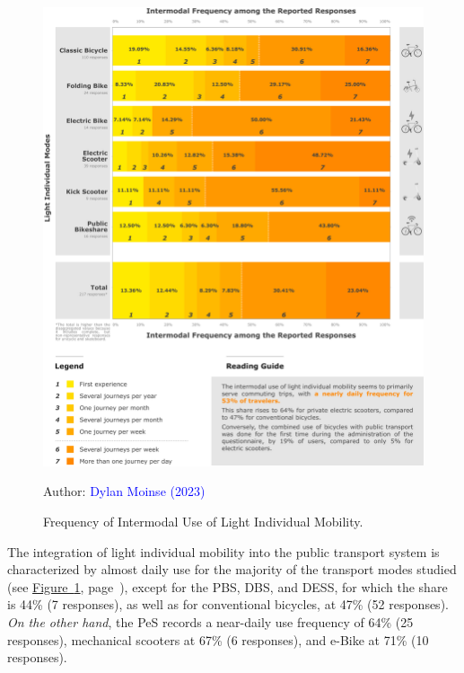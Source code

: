 \begin{refsegment}
\begin{figure}[h!]\vspace*{4pt}
    \caption{Frequency of Intermodal Use of Light Individual Mobility.}
    \label{fig-chap4:frequence-modes}
    \centerline{\includegraphics[width=1\columnwidth]{src/Figures/Chap-4/EN_Frequence.pdf}}
    \vspace{5pt}
    \begin{flushright}\scriptsize{
    Author: \textcolor{blue}{Dylan Moinse (2023)}
    }\end{flushright}
\end{figure}

The integration of light individual mobility into the public transport system is characterized by almost daily use for the majority of the transport modes studied (see \hyperref[fig-chap4:frequence-modes]{Figure~\ref{fig-chap4:frequence-modes}}, page~\pageref{fig-chap4:frequence-modes}), except for the \acrshort{PBS}, \acrshort{DBS}, and \acrshort{DESS}, for which the share is 44\% (7 responses), as well as for conventional bicycles, at 47\% (52 responses). \textsl{On the other hand}, the \acrshort{PeS} records a near-daily use frequency of 64\% (25 responses), mechanical scooters at 67\% (6 responses), and \acrshort{e-Bike} at 71\% (10 responses).%


\end{refsegment}
